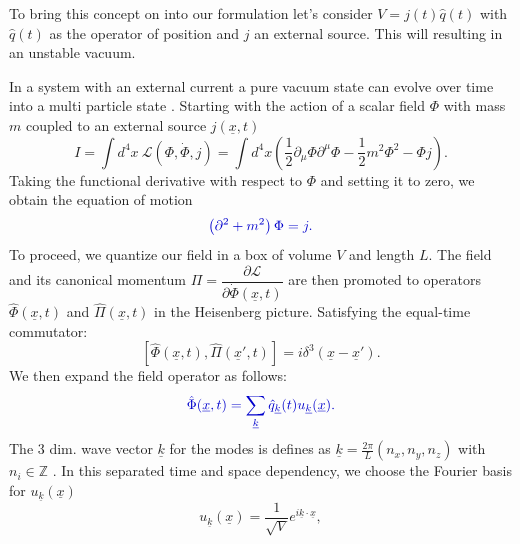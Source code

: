 \documentclass[12pt, titlepage]{article}
\begin{document}
To bring this concept on into our formulation let's consider $ V=j(t)\hat{q}(t) $ with $ \hat{q}(t) $ as the operator of position and $ j $ an external source. This will resulting in an unstable vacuum. 

In a system with an external current a pure vacuum state can evolve over time into a multi particle state .
Starting with the action of a scalar field $ \Phi $ with mass $ m $ coupled to an external source $ j(\underline{x},t) $
\begin{equation}
I=\int d^{4}x \ \mathcal{L}(\Phi, \dot{\Phi},j)=
\int d^{4}x 
\left(
\frac{1}{2}\partial_{\mu}\Phi\partial^{\mu}\Phi
-\frac{1}{2}m^{2}\Phi^{2}
-\Phi j
 \right)
 .
\end{equation}
Taking the functional derivative with respect to $ \Phi $ and setting it to zero, we obtain the equation of motion
\begin{equation}\label{motion_scalar}
\textcolor[RGB]{0,0,204}{
\left(
\partial^{2}+m^{2}
 \right)\Phi
 =j
 .}
\end{equation}
To proceed, we quantize our field in a box of volume $ V $ and length $ L $. The field and its canonical momentum $ \Pi = \dfrac{\partial \mathcal{L}}{\partial\dot{\Phi}(\underline{x},t)} $ are then promoted to operators $ \hat{\Phi}(\underline{x},t) $ and  $ \hat{\Pi}(\underline{x},t) $ in the Heisenberg picture. Satisfying the equal-time commutator:
\begin{equation}
\left[
\hat{\Phi}(\underline{x},t),\hat{\Pi}(\underline{x}',t)
 \right] 
 =
 i
 \delta^{3}
 (\underline{x} - \underline{x}')
 .
\end{equation}
We then expand the field operator as follows:
\begin{equation}\label{box_quanta}
\textcolor[RGB]{0,0,204}{
\hat{\Phi} (\underline{x},t)= \sum_{\underline{k}} \hat{q}_{\underline{k}}(t)u_{\underline{k}}(\underline{x})
 .}
\end{equation}
The 3 dim. wave vector $ \underline{k} $ for the modes is defines as $ \underline{k} = \frac{2\pi}{L}(n_{x},n_{y},n_{z}) $ with $ n_{i}\in \mathbb{Z} $ . 
	In this separated time and space dependency, we choose the Fourier basis for $ u_{\underline{k}}(\underline{x}) $
\begin{equation}\label{fourierbasis}
u_{\underline{k}}(\underline{x})
=
\dfrac{1}{\sqrt{V}} e^{i\underline{k}\cdot \underline{x}}
,
\end{equation}
\end{document}
